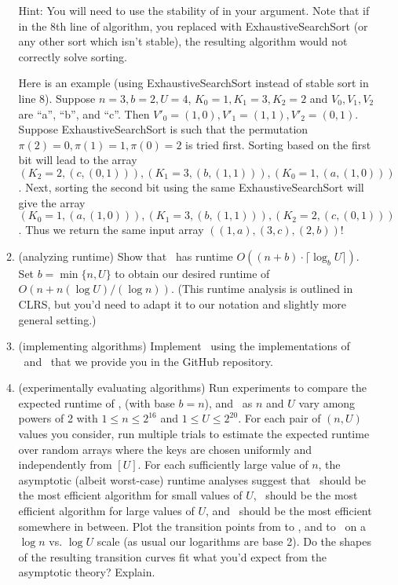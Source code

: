 \documentclass[11pt]{article}
\begin{document}
\begin{enumerate}
\begin{enumerate}
            Hint: You will need to use the stability of \CountingSort in your argument. Note that if in the 8th line of \RadixSort algorithm, you replaced \CountingSort with ExhaustiveSearchSort (or any other sort which isn't stable), the resulting algorithm would not correctly solve sorting. 

            Here is an example (using ExhaustiveSearchSort instead of stable sort in line 8). Suppose $n=3, b=2, U=4$, $K_0=1, K_1=3, K_2=2$ and $V_0, V_1, V_2$ are ``a'', ``b'', and ``c''. Then $V'_0=(1,0), V'_1=(1,1), V'_2=(0,1)$. Suppose ExhaustiveSearchSort is such that the permutation $\pi(2)=0, \pi(1)=1, \pi(0)=2$ 
 is tried first. Sorting based on the first bit will lead to the array $(K_2=2, (c,(0,1))), (K_1=3, (b,(1,1))), (K_0=1,(a,(1,0)))$. Next, sorting the second bit using the same ExhaustiveSearchSort will give the array $(K_0=1,(a,(1,0))), (K_1=3, (b,(1,1))), (K_2=2, (c,(0,1)))$. Thus we return the same input array $((1,a),(3,c),(2,b))$!
            
            \item (analyzing runtime) Show that \RadixSort\ has runtime $O((n+b)\cdot \lceil \log_b U\rceil)$.  Set $b=\min\{n,U\}$ to obtain our desired runtime of $O(n+n(\log U)/(\log n))$.  (This runtime analysis is outlined in CLRS, but you'd need to adapt it to our notation and slightly more general setting.) 
            
            \item (implementing algorithms)
            Implement \RadixSort\ using the implementations of \CountingSort\ and \BC\ that we provide you in the GitHub repository. 
  
            \item (experimentally evaluating algorithms) Run experiments to compare the expected runtime of \CountingSort, \RadixSort (with base $b=n$), and \MergeSort\ as $n$ and $U$ vary among powers of 2 with $1\leq n\leq 2^{16}$ and $1\leq U\leq 2^{20}$.  For each pair of $(n,U)$ values you consider, run multiple trials to estimate the expected runtime over random arrays where the keys are chosen uniformly and independently from $[U]$.  For each sufficiently large value of $n$, the asymptotic (albeit worst-case) runtime analyses suggest that \CountingSort\ should be the most efficient algorithm for small values of $U$, \MergeSort\ should be the most efficient algorithm for large values of $U$, and \RadixSort\ should be the most efficient somewhere in between.  Plot the transition points from \CountingSort to \RadixSort, and \RadixSort to \MergeSort\ on a $\log n$ vs. $\log U$ scale (as usual our logarithms are base 2).  Do the shapes of the resulting transition curves fit what you'd expect from the asymptotic theory?  Explain.
            

\end{enumerate}
\end{enumerate}
\end{document}
